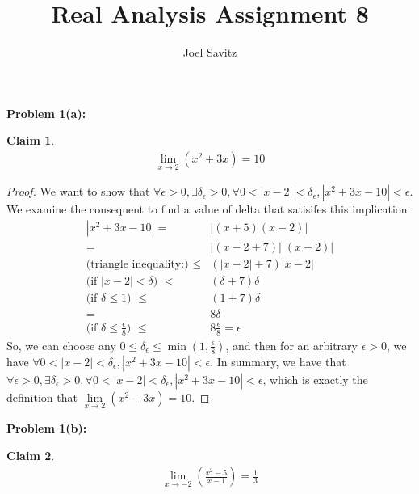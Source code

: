 \documentclass{article}
\title{Real Analysis Assignment 8}
\author{Joel Savitz}
\newcommand{\eps}{\ensuremath{\epsilon}}
\newtheorem{clm}{Claim}
\begin{document}
\maketitle

\textbf{Problem 1(a):}

\begin{clm}
	\begin{align}
	\lim_{x\to 2} (x^2 + 3x) = 10
	\end{align}
\end{clm}

\begin{proof}
	We want to show that
	$\forall \eps > 0, \exists \delta_\eps > 0,
	\forall 0 < |x - 2| < \delta_\eps, |x^2 + 3x - 10| < \eps$.
	We examine the consequent to find a value of delta
	that satisifes this implication:
	\begin{align}
		|x^2 + 3x - 10| = & |(x+5)(x-2)| \\
				= & |(x - 2 + 7)||(x - 2)| \\
		\textrm{(triangle inequality:) }\le & (|x - 2| + 7)|x-2| \\
		\textrm{(if $|x - 2| < \delta$) } < & (\delta + 7)\delta \\
		\textrm{(if  $\delta \le 1$) } \le & (1 + 7)\delta \\
				= & 8\delta \\
			\textrm{(if $\delta \le \frac{\eps}{8}$) } \le & 8\frac{\eps}{8} = \eps
	\end{align}
	So, we can choose any $0 \le \delta_\eps \le \min(1, \frac{\eps}{8})$,
	and then for an arbitrary $\eps > 0$,
	we have 
	$\forall 0 < |x - 2| < \delta_\eps, |x^2 + 3x - 10| < \eps$.
	In summary,
	we have that
	$\forall \eps > 0,
	\exists \delta_\eps > 0,
	\forall 0 < |x - 2| < \delta_\eps,
	|x^2+3x-10| < \eps$,
	which is exactly the definition that 
	$\underset{x\to 2}{\lim} (x^2 + 3x) = 10$.
\end{proof}

\textbf{Problem 1(b):}

\begin{clm}
	\begin{align}
		\lim_{x\to -2} (\frac{x^2 - 5}{x - 1}) = \frac{1}{3}
	\end{align}
\end{clm}
\end{document}
